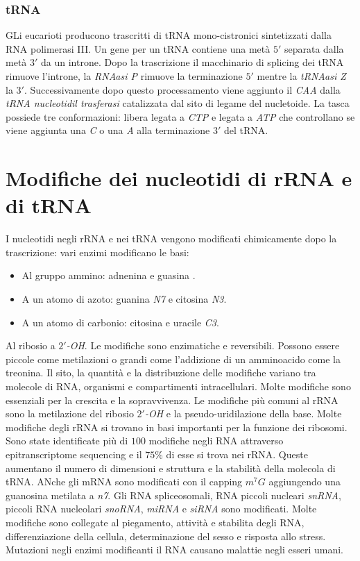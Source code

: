 \subsubsection{tRNA}
GLi eucarioti producono trascritti di tRNA mono-cistronici sintetizzati dalla RNA polimerasi III. Un gene per un tRNA contiene una met\`a $5'$ separata dalla met\`a $3'$ da un
introne. Dopo la trascrizione il macchinario di splicing dei tRNA rimuove l'introne, la \emph{RNAasi P} rimuove la terminazione $5'$ mentre la \emph{tRNAasi Z} la $3'$. Successivamente
dopo questo processamento viene aggiunto il \emph{CAA} dalla \emph{tRNA nucleotidil trasferasi} catalizzata dal sito di legame del nucletoide. La tasca possiede tre conformazioni: libera
legata a \emph{CTP} e legata a \emph{ATP} che controllano se viene aggiunta una \emph{C} o una \emph{A} alla terminazione $3'$ del tRNA. 
\section{Modifiche dei nucleotidi di rRNA e di tRNA}
I nucleotidi negli rRNA e nei tRNA vengono modificati chimicamente dopo la trascrizione: vari enzimi modificano le basi: 
\begin{itemize}
	\item Al gruppo ammino: adnenina e guasina \emph{}.
	\item A un atomo di azoto: guanina \emph{N7} e citosina \emph{N3}.
	\item A un atomo di carbonio: citosina e uracile \emph{C3}.
\end{itemize}
Al ribosio a \emph{$2'$-OH}. Le modifiche sono enzimatiche e reversibili. Possono essere piccole come metilazioni o grandi come l'addizione di un amminoacido come la treonina. Il sito, 
la quantit\`a e la distribuzione delle modifiche variano tra molecole di RNA, organismi e compartimenti intracellulari. Molte modifiche sono essenziali per la crescita e la 
sopravvivenza. Le modifiche pi\`u comuni al rRNA sono la metilazione del ribosio \emph{$2'$-OH} e la pseudo-uridilazione della base. Molte modifiche degli rRNA si trovano in basi 
importanti per la funzione dei ribosomi. Sono state identificate pi\`u di $100$ modifiche negli RNA attraverso epitranscriptome sequencing e il $75\%$ di esse si trova nei rRNA. 
Queste aumentano il numero di dimensioni e struttura e la stabilit\`a della molecola di tRNA. ANche gli mRNA sono modificati con il capping $m^7G$ aggiungendo una guanosina metilata
a \emph{n7}. Gli RNA spliceosomali, RNA piccoli nucleari \emph{snRNA}, piccoli RNA nucleolari \emph{snoRNA}, \emph{miRNA} e \emph{siRNA} sono modificati. Molte modifiche sono collegate
al piegamento, attivit\`a e stabilita degli RNA, differenziazione della cellula, determinazione del sesso e risposta allo stress. Mutazioni negli enzimi modificanti il RNA causano 
malattie negli esseri umani. 

